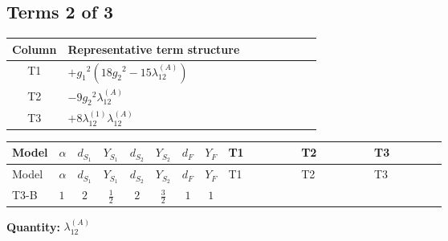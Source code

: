 \documentclass[8pt]{article}
\begin{document}
\begin{landscape}
\subsection*{Terms 2 of 3}
\begin{center}
\begin{tabular}{@{}c >{\raggedright\arraybackslash}p{0.82\linewidth}@{}}
\toprule
Column & Representative term structure \\
\midrule
T1 & \(\displaystyle +{g_1}^2 \left(18 {g_2}^2-15 {\lambda_{12}^{(A)}}\right)\) \\
\midrule
T2 & \(\displaystyle -9 {g_2}^2 {\lambda_{12}^{(A)}}\) \\
\midrule
T3 & \(\displaystyle +8 {\lambda_{12}^{(1)}} {\lambda_{12}^{(A)}}\) \\
\midrule
\bottomrule
\end{tabular}
\end{center}
\smallskip
\tiny
\begin{longtable}{@{}llcccccc >{\raggedright\arraybackslash}p{0.21\linewidth} >{\raggedright\arraybackslash}p{0.21\linewidth} >{\raggedright\arraybackslash}p{0.21\linewidth}@{}}
\toprule
Model & $\alpha$ & $d_{S_1}$ & $Y_{S_1}$ & $d_{S_2}$ & $Y_{S_2}$ & $d_F$ & $Y_F$ & T1 & T2 & T3 \\
\midrule
\endfirsthead
\toprule
Model & $\alpha$ & $d_{S_1}$ & $Y_{S_1}$ & $d_{S_2}$ & $Y_{S_2}$ & $d_F$ & $Y_F$ & T1 & T2 & T3 \\
\midrule
\endhead
T3-B & $1$ & $2$ & $\frac{1}{2}$ & $2$ & $\frac{3}{2}$ & $1$ & $1$ & \scriptsize\adjustbox{max width=\linewidth}{$\begin{gathered} +{g_1}^2 \left(18 {g_2}^2-15 {\lambda_{12}^{(A)}}\right)\end{gathered}$} & \scriptsize\adjustbox{max width=\linewidth}{$\begin{gathered} -9 {g_2}^2 {\lambda_{12}^{(A)}}\end{gathered}$} & \scriptsize\adjustbox{max width=\linewidth}{$\begin{gathered} +8 {\lambda_{12}^{(1)}} {\lambda_{12}^{(A)}}\end{gathered}$} \\
\midrule
\bottomrule
\end{longtable}
\clearpage
\noindent\textbf{Quantity: }$\lambda_{12}^{(A)}$\par\smallskip

\end{landscape}
\end{document}
